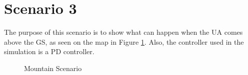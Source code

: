 \section{Scenario 3}\label{sec:scenario3}
The purpose of this scenario is to show what can happen when the UA comes above the GS, as seen on the map in Figure \ref{fig:s3_map}. Also, the controller used in the simulation is a PD controller.

\begin{figure}[H]
	\hfill
	\hfill
	\hfill
	\caption{Mountain Scenario}
	\label{fig:s3_map}
\end{figure}

